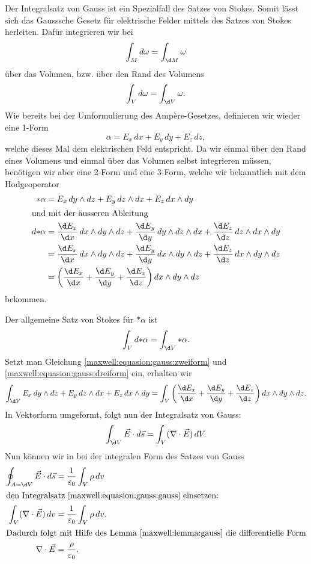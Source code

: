 Der Integralsatz von Gauss ist ein Spezialfall des Satzes von Stokes.
Somit lässt sich das Gausssche Gesetz für elektrische Felder mittels des Satzes von Stokes herleiten.
Dafür integrieren wir bei
\[
\int_{M} d\omega
=
\int_{\d M} \omega
\]
über das Volumen, bzw. über den Rand des Volumens
\[
\int_{V} d\omega
=
\int_{\d V} \omega .
\]
Wie bereits bei der Umformulierung des Ampère-Gesetzes, definieren wir wieder eine 1-Form
\[
\alpha
=
E_x \, dx + E_y \, dy + E_z \, dz ,
\]
welche dieses Mal dem elektrischen Feld entspricht.
Da wir einmal über den Rand eines Volumens und einmal über das Volumen selbst integrieren müssen, benötigen wir aber eine 2-Form und eine 3-Form, welche wir bekanntlich mit dem Hodgeoperator
\begin{align}
	\ast\alpha
	&=
	E_x \, dy \wedge dz + E_y \, dz \wedge dx + E_z \, dx \wedge dy
	\label{maxwell:equasion:gauss:zweiform}
	\\
	\intertext{und mit der äusseren Ableitung}
	d{\ast}\alpha
	&=
	\frac{\d E_x}{\d x} \, dx \wedge dy \wedge dz +
	\frac{\d E_y}{\d y} \, dy \wedge dz \wedge dx +
	\frac{\d E_z}{\d z} \, dz \wedge dx \wedge dy
	\notag
	\\ 
	&=
	\frac{\d E_x}{\d x} \, dx \wedge dy \wedge dz +
	\frac{\d E_y}{\d y} \, dx \wedge dy \wedge dz +
	\frac{\d E_z}{\d z} \, dx \wedge dy \wedge dz
	\notag
	\\
	&=
	\left(
	\frac{\d E_x}{\d x} + \frac{\d E_y}{\d y} + \frac{\d E_z}{\d z}
	\right)
	dx \wedge dy \wedge dz 
	\label{maxwell:equasion:gauss:dreiform}
\end{align}
bekommen.

Der allgemeine Satz von Stokes für $\ast \alpha$ ist
\[
\int_{V} d {\ast} \alpha 
=
\int_{\d V} \ast \alpha .
\]
Setzt man Gleichung \eqref{maxwell:equasion:gauss:zweiform} und \eqref{maxwell:equasion:gauss:dreiform} ein, erhalten wir
\[
\int_{\d V}
E_x \, dy \wedge dz + E_y \, dz \wedge dx + E_z \, dx \wedge dy
=
\int_{V}
\left(
\frac{\d E_x}{\d x} + \frac{\d E_y}{\d y} + \frac{\d E_z}{\d z}
\right)
dx \wedge dy \wedge dz .
\]
In Vektorform umgeformt, folgt nun der Integralsatz von Gauss:
\begin{equation}
	\label{maxwell:equasion:gauss:gauss}
	\int_{\d V}
	\vec{E} \cdot d\vec{s}
	=
	\int_{V}
	(\nabla \cdot \vec{E}) \, dV .
\end{equation}
Nun können wir in bei der integralen Form des Satzes von Gauss
\begin{align*}
	\oint_{A=\d V} \vec{E} \cdot d\vec{s}
	&=
	\frac{1}{\varepsilon_0}\int_{V} \rho \, dv
	\\
	\intertext{den Integralsatz \eqref{maxwell:equasion:gauss:gauss} einsetzen:}
	\int_{V}
	(\nabla \cdot \vec{E}) \, dv
	&=
	\frac{1}{\varepsilon_0}\int_{V} \rho \, dv .
	\\
	\intertext{Dadurch folgt mit Hilfe des Lemma \ref{maxwell:lemma:gauss} die differentielle Form}
	\nabla \cdot \vec{E}
	&=
	\frac{\rho}{\varepsilon_0}.
\end{align*} 

